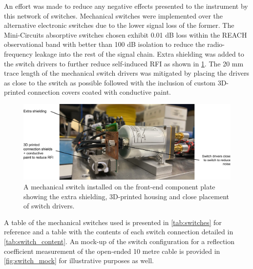 An effort was made to reduce any negative effects presented to the instrument by this network of switches. Mechanical switches were implemented over the alternative electronic switches due to the lower signal loss of the former. The Mini-Circuits absorptive switches chosen exhibit 0.01 dB loss within the REACH observational band with better than 100 dB isolation to reduce the radio-frequency leakage into the rest of the signal chain. Extra shielding was added to the switch drivers to further reduce self-induced RFI as shown in \cref{fig:switches}. The 20 mm trace length of the mechanical switch drivers was mitigated by placing the drivers as close to the switch as possible followed with the inclusion of custom 3D-printed connection covers coated with conductive paint.
\begin{figure}
    \centering
    \includegraphics[width=\textwidth]{switches}
    \caption{A mechanical switch installed on the front-end component plate showing the extra shielding, 3D-printed housing and close placement of switch drivers.}
    \label{fig:switches}
\end{figure}
A table of the mechanical switches used is presented in \cref{tab:switches} for reference and a table with the contents of each switch connection detailed in \cref{tab:switch_content}. An mock-up of the switch configuration for a reflection coefficient measurement of the open-ended 10 metre cable is provided in \cref{fig:switch_mock} for illustrative purposes as well.
